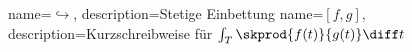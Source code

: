 
 {
    name={\ensuremath{\hookrightarrow}}, 
    description={Stetige Einbettung}
}
 {
    name={\ensuremath{[f, g]}},
    description={Kurzschreibweise für \ensuremath{\int_{T} \skprod{f(t)}{g(t)} \diff t}}
}

